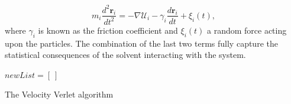 \begin{equation}
    m_i \frac{d^2 \boldsymbol{r}_i}{dt^2} = - \nabla \mathcal{U}_i - \gamma_i \frac{d
    \boldsymbol{r}_i}{d t} +
    \xi_i(t),
\end{equation}
where $\gamma_i$ is known  as the friction coefficient and $\xi_i(t)$ a random force
acting upon the particles. The combination of the last two terms fully capture the
statistical consequences of the solvent interacting with the system.


\begin{algorithm}


    $newList = [\ ]$



    \caption{The Velocity Verlet algorithm}
\end{algorithm}

%


